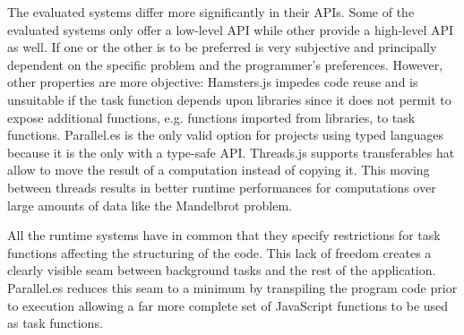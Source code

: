 The evaluated systems differ more significantly in their APIs. Some of the evaluated systems only offer a low-level API while other provide a high-level API as well. If one or the other is to be preferred is very subjective and principally dependent on the specific problem and the programmer's preferences. However, other properties are more objective: Hamsters.js impedes code reuse and is unsuitable if the task function depends upon libraries since it does not permit to expose additional functions, e.g. functions imported from libraries, to task functions. Parallel.es is the only valid option for projects using typed languages because it is the only with a type-safe API. Threads.js supports transferables hat allow to move the result of a computation instead of copying it. This moving between threads results in better runtime performances for computations over large amounts of data like the Mandelbrot problem.


All the runtime systems have in common that they specify restrictions for task functions affecting the structuring of the code. This lack of freedom creates a clearly visible seam between background tasks and the rest of the application. Parallel.es reduces this seam to a minimum by transpiling the program code prior to execution allowing a far more complete set of JavaScript functions to be used as task functions.
